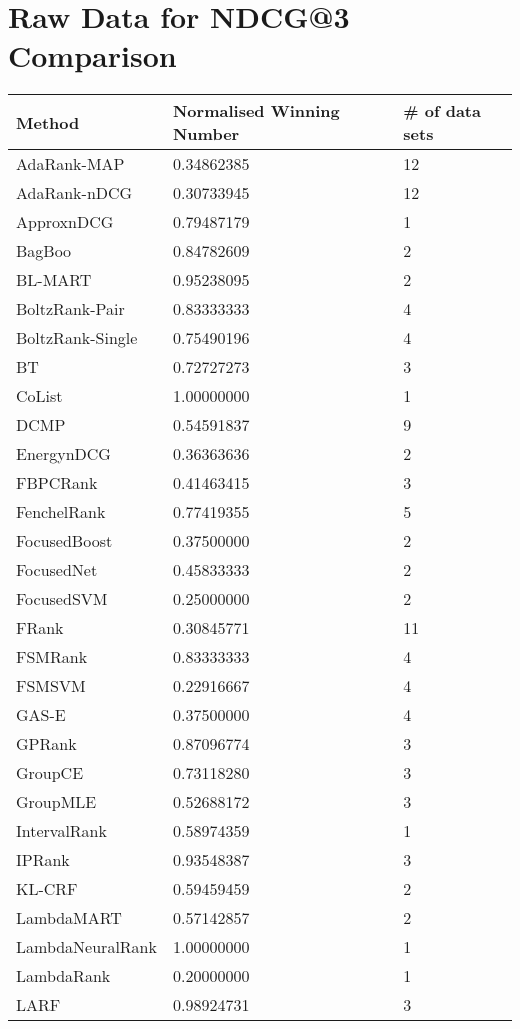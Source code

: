\chapter{Raw Data for NDCG@3 Comparison}
\label{app:norm_winnum_ndcg3}

\begin{longtable}{l|l|l}
Method & Normalised Winning Number & \# of data sets \\
\hline
AdaRank-\acs{MAP} & 0.34862385 & 12 \\ 
AdaRank-\acs{nDCG} & 0.30733945 & 12 \\ 
Approx\acs{nDCG} & 0.79487179 & 1 \\ 
BagBoo & 0.84782609 & 2 \\ 
BL-MART & 0.95238095 & 2 \\ 
BoltzRank-Pair & 0.83333333 & 4 \\ 
BoltzRank-Single & 0.75490196 & 4 \\ 
BT & 0.72727273 & 3 \\ 
CoList & 1.00000000 & 1 \\ 
DCMP & 0.54591837 & 9 \\ 
Energy\acs{nDCG} & 0.36363636 & 2 \\ 
FBPCRank & 0.41463415 & 3 \\ 
FenchelRank & 0.77419355 & 5 \\ 
FocusedBoost & 0.37500000 & 2 \\ 
FocusedNet & 0.45833333 & 2 \\ 
Focused\acs{SVM} & 0.25000000 & 2 \\ 
FRank & 0.30845771 & 11 \\ 
FSMRank & 0.83333333 & 4 \\ 
FSM\acs{SVM} & 0.22916667 & 4 \\ 
GAS-E & 0.37500000 & 4 \\ 
\acs{GP}Rank & 0.87096774 & 3 \\ 
GroupCE & 0.73118280 & 3 \\ 
Group\acs{MLE} & 0.52688172 & 3 \\ 
IntervalRank & 0.58974359 & 1 \\ 
\acs{IP}Rank & 0.93548387 & 3 \\ 
KL-\acs{CRF} & 0.59459459 & 2 \\ 
LambdaMART & 0.57142857 & 2 \\ 
LambdaNeuralRank & 1.00000000 & 1 \\ 
LambdaRank & 0.20000000 & 1 \\ 
LARF & 0.98924731 & 3 \\ 

\end{longtable}
